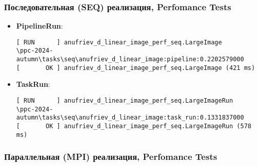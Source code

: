 \documentclass[12pt]{article}
\begin{document}
\subsubsection{Последовательная (SEQ) реализация, Perfomance Tests}

\begin{itemize}
    \item \textbf{PipelineRun}:
    \begin{verbatim}
[ RUN      ] anufriev_d_linear_image_perf_seq.LargeImage
\ppc-2024-autumn\tasks\seq\anufriev_d_linear_image:pipeline:0.2202579000
[       OK ] anufriev_d_linear_image_perf_seq.LargeImage (421 ms)
    \end{verbatim}
    \item \textbf{TaskRun}:
    \begin{verbatim}
[ RUN      ] anufriev_d_linear_image_perf_seq.LargeImageRun
\ppc-2024-autumn\tasks\seq\anufriev_d_linear_image:task_run:0.1331837000
[       OK ] anufriev_d_linear_image_perf_seq.LargeImageRun (578 ms)
    \end{verbatim}
\end{itemize}

\subsubsection{Параллельная (MPI) реализация, Perfomance Tests}
\end{document}
